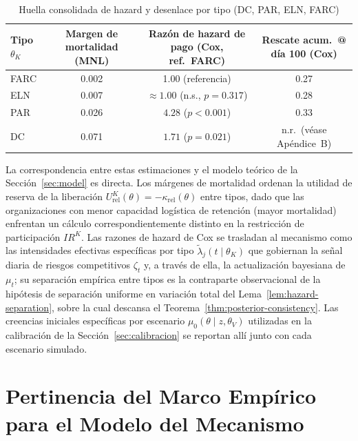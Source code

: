 \documentclass[review,authoryear,12pt]{elsarticle}
\theoremstyle{plain}
\theoremstyle{definition}
\newcommand{\1}{\mathbf{1}}
\begin{document}
\begin{table}[H]
\centering
\caption{Huella consolidada de hazard y desenlace por tipo (DC, PAR, ELN, FARC)}
\label{tab:hazard-prior-summary}
\begin{tabular}{lccc}
\toprule
Tipo $\theta_K$ & Margen de mortalidad (MNL) & Razón de hazard de pago (Cox, ref.\ FARC) & Rescate acum.\ @ día 100 (Cox) \\
\midrule
FARC & 0.002 & 1.00 (referencia) & 0.27 \\
ELN  & 0.007 & $\approx 1.00$ (n.s., $p=0.317$) & 0.28 \\
PAR  & 0.026 & $4.28$ ($p<0.001$) & 0.33 \\
DC   & 0.071 & $1.71$ ($p=0.021$) & n.r.\ (véase Apéndice~B) \\
\bottomrule
\end{tabular}
\end{table}

La correspondencia entre estas estimaciones y el modelo teórico de la Sección~\ref{sec:model} es directa. Los márgenes de mortalidad ordenan la utilidad de reserva de la liberación $U^K_{\mathrm{rel}}(\theta)=-\kappa_{\mathrm{rel}}(\theta)$ entre tipos, dado que las organizaciones con menor capacidad logística de retención (mayor mortalidad) enfrentan un cálculo correspondientemente distinto en la restricción de participación $IR^K$. Las razones de hazard de Cox se trasladan al mecanismo como las intensidades efectivas específicas por tipo $\tilde\lambda_j(t\mid\theta_K)$ que gobiernan la señal diaria de riesgos competitivos $\zeta_t$ y, a través de ella, la actualización bayesiana de $\mu_t$; su separación empírica entre tipos es la contraparte observacional de la hipótesis de separación uniforme en variación total del Lema~\ref{lem:hazard-separation}, sobre la cual descansa el Teorema~\ref{thm:posterior-consistency}. Las creencias iniciales específicas por escenario $\mu_0(\theta\mid z,\theta_V)$ utilizadas en la calibración de la Sección~\ref{sec:calibracion} se reportan allí junto con cada escenario simulado.

\section{Pertinencia del Marco Empírico para el Modelo del Mecanismo}\label{sec:pertinencia}
\end{document}
